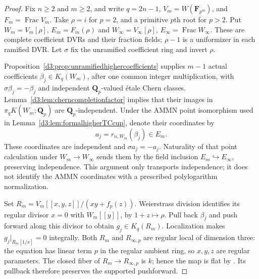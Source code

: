 \documentclass[11pt,a4paper]{amsart}
\numberwithin{equation}{section}
\theoremstyle{definition}
\theoremstyle{remark}
\newcommand{\Q}{\mathbf Q}
\newcommand{\F}{\mathbf F}
\newcommand{\Frac}{\operatorname{Frac}}
\begin{document}
\begin{proof}
Fix $n\geq2$ and $m\geq2$, and write $q=2n-1$,
$V_m=W(\F_{p^m})$, and $F_m=\Frac V_m$.
Take $\rho=i$ for $p=2$, and a primitive $p$th root for $p>2$.
Put $W_m=V_m[\rho]$, $E_m=F_m(\rho)$ and
$W_\infty=V_\infty[\rho]$, $E_\infty=\Frac W_\infty$.
These are complete coefficient DVRs and their fraction fields;
$\rho-1$ is a uniformizer in each ramified DVR.
Let $\sigma$ fix the unramified coefficient ring and invert $\rho$.

Proposition~\ref{d3:prop:unramifiedhighercoefficients} supplies
$m-1$ actual coefficients $\beta_j\in K_q(W_m)$, after one
common integer multiplication, with $\sigma\beta_j=-\beta_j$
and independent $\Q_p$-valued \'etale Chern classes.
Lemma~\ref{d3:lem:cherncompletionfactor} implies that their images
in $\pi_qK(W_m;\Q_p)$ are $\Q_p$-independent.
Under the AMMN point isomorphism used in
Lemma~\ref{d3:lem:formalhigherTCcup}, denote their coordinates by
\[
 a_j=r_{n,W_m}(\beta_j)\in E_m.
\]
These coordinates are independent and $\sigma a_j=-a_j$.
Naturality of that point calculation under $W_m\to W_\infty$
sends them by the field inclusion $E_m\hookrightarrow E_\infty$,
preserving independence. This argument only transports independence;
it does not identify the AMMN coordinates with a prescribed
polylogarithm normalization.

Set $R_m=V_m[[x,y,z]]/(xy+f_p(z))$.
Weierstrass division identifies its regular divisor $x=0$ with
$W_m[[y]]$, by $1+z\mapsto\rho$.
Pull back $\beta_j$ and push forward along this divisor to obtain
$g_j\in K_q(R_m)$. Localization makes $g_j|_{R_m[1/x]}=0$
integrally.
Both $R_m$ and $R_{\infty,p}$ are regular local of dimension three:
the equation has linear term $p$ in the regular ambient ring,
so $x,y,z$ are regular parameters.
The closed fiber of $R_m\to R_{\infty,p}$ is $k$; hence the map
is flat by \cite[Tag~00R4]{StacksFlatness}.
Its pullback therefore preserves the supported pushforward.


\end{proof}
\end{document}
